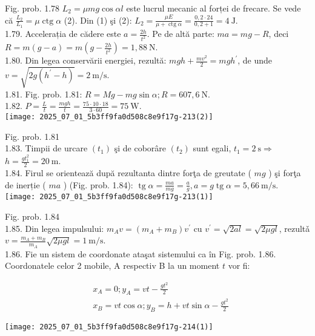 Fig. prob. 1.78 $L_{2}=\mu m g \cos \alpha l$ este lucrul mecanic al forței de frecare. Se vede că $\frac{L_{2}}{L_{1}}=\mu \operatorname{ctg} \alpha$ (2). Din (1) şi (2): $L_{2}=\frac{\mu E}{\mu+\operatorname{ctg} \alpha}=\frac{0,2 \cdot 24}{0,2+1}=4 \mathrm{~J}$.\\
1.79. Accelerația de cădere este $a=\frac{2 h}{t^{2}}$. Pe de altă parte: $m a=m g-R$, deci $R=m(g-a)=m\left(g-\frac{2 h}{t^{2}}\right)=1,88 \mathrm{~N}$.\\
1.80. Din legea conservării energiei, rezultă: $m g h+\frac{m v^{2}}{2}=m g h^{\prime}$, de unde $v=\sqrt{2 g\left(h^{\prime}-h\right)}=2 \mathrm{~m} / \mathrm{s}$.\\
1.81. Fig. prob. 1.81: $R=M g-m g \sin \alpha ; R=607,6 \mathrm{~N}$.\\
1.82. $P=\frac{L}{t}=\frac{m g h}{t}=\frac{75 \cdot 10 \cdot 18}{3 \cdot 60}=75 \mathrm{~W}$.\\
\texttt{[image: 2025\_07\_01\_5b3ff9fa0d508c8e9f17g-213(2)]}

Fig. prob. 1.81\\
1.83. Timpii de urcare $\left(t_{1}\right)$ şi de coborâre $\left(t_{2}\right)$ sunt egali, $t_{1}=2 \mathrm{~s} \Rightarrow$ $h=\frac{g t_{1}^{2}}{2}=20 \mathrm{~m}$.\\
1.84. Firul se orientează după rezultanta dintre forţa de greutate ( $m g$ ) şi forţa de inerție ( $m a$ ) (Fig. prob. 1.84): $\operatorname{tg} \alpha=\frac{m a}{m g}=\frac{a}{g}, a=g \operatorname{tg} \alpha=5,66 \mathrm{~m} / \mathrm{s}$.\\
\texttt{[image: 2025\_07\_01\_5b3ff9fa0d508c8e9f17g-213(1)]}

Fig. prob. 1.84\\
1.85. Din legea impulsului: $m_{A} v=\left(m_{A}+m_{B}\right) v^{\prime}$ cu $v^{\prime}=\sqrt{2 a l}=\sqrt{2 \mu g l}$, rezultǎ $v=\frac{m_{A}+m_{B}}{m_{A}} \sqrt{2 \mu g l}=1 \mathrm{~m} / \mathrm{s}$.\\
1.86. Fie un sistem de coordonate ataşat sistemului ca în Fig. prob. 1.86. Coordonatele celor 2 mobile, A respectiv B la un moment $t$ vor fi:

$$
\begin{aligned}
& x_{A}=0 ; y_{A}=v t-\frac{g t^{2}}{2} \\
& x_{B}=v t \cos \alpha ; y_{B}=h+v t \sin \alpha-\frac{g t^{2}}{2}
\end{aligned}
$$

\begin{center}
\texttt{[image: 2025\_07\_01\_5b3ff9fa0d508c8e9f17g-214(1)]}
\end{center}


